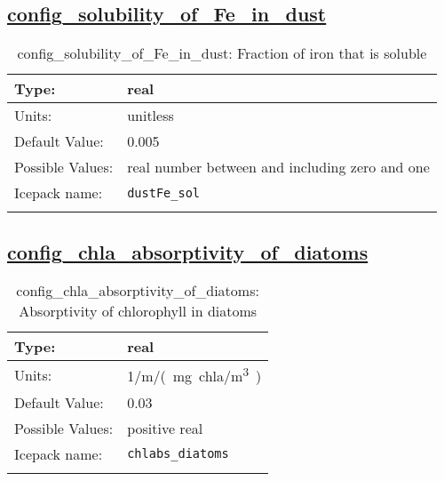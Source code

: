 \subsection[config\_solubility\_of\_Fe\_in\_dust]{\hyperref[sec:nm_tab_biogeochemistry]{config\_solubility\_of\_Fe\_in\_dust}}
\label{subsec:nm_sec_config_solubility_of_Fe_in_dust}
\begin{center}
\begin{longtable}{| p{2.0in} || p{4.0in} |}
    \hline
    Type: & real \\
    \hline
    Units: & \si{unitless} \\
    \hline
    Default Value: & 0.005 \\
    \hline
    Possible Values: & real number between and including zero and one \\
    \hline
    Icepack name: & \verb+dustFe_sol+ \\
    \hline
    \caption{config\_solubility\_of\_Fe\_in\_dust: Fraction of iron that is soluble}
\end{longtable}
\end{center}
\subsection[config\_chla\_absorptivity\_of\_diatoms]{\hyperref[sec:nm_tab_biogeochemistry]{config\_chla\_absorptivity\_of\_diatoms}}
\label{subsec:nm_sec_config_chla_absorptivity_of_diatoms}
\begin{center}
\begin{longtable}{| p{2.0in} || p{4.0in} |}
    \hline
    Type: & real \\
    \hline
    Units: & \si{1/m/(mg.chla/m^3)} \\
    \hline
    Default Value: & 0.03 \\
    \hline
    Possible Values: & positive real \\
    \hline
    Icepack name: & \verb+chlabs_diatoms+ \\
    \hline
    \caption{config\_chla\_absorptivity\_of\_diatoms: Absorptivity of chlorophyll in diatoms}
\end{longtable}
\end{center}
